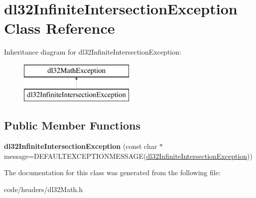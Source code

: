 \hypertarget{classdl32_infinite_intersection_exception}{\section{dl32\-Infinite\-Intersection\-Exception Class Reference}
\label{classdl32_infinite_intersection_exception}
}
Inheritance diagram for dl32\-Infinite\-Intersection\-Exception\-:\begin{figure}[H]
\begin{center}
\leavevmode
\includegraphics[height=2.000000cm]{classdl32_infinite_intersection_exception}
\end{center}
\end{figure}
\subsection*{Public Member Functions}
\begin{DoxyCompactItemize}
\item 
\hypertarget{classdl32_infinite_intersection_exception_a205ed9826975434a34727564d593738e}{{\bfseries dl32\-Infinite\-Intersection\-Exception} (const char $\ast$message=D\-E\-F\-A\-U\-L\-T\-E\-X\-C\-E\-P\-T\-I\-O\-N\-M\-E\-S\-S\-A\-G\-E(\hyperlink{classdl32_infinite_intersection_exception}{dl32\-Infinite\-Intersection\-Exception}))}\label{classdl32_infinite_intersection_exception_a205ed9826975434a34727564d593738e}

\end{DoxyCompactItemize}


The documentation for this class was generated from the following file\-:\begin{DoxyCompactItemize}
\item 
code/headers/dl32\-Math.\-h\end{DoxyCompactItemize}
